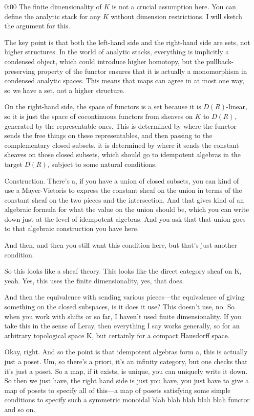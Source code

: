 \begin{unfinished}{0:00}
The finite dimensionality of $K$ is not a crucial assumption here. You can define the analytic stack for any $K$ without dimension restrictions. I will sketch the argument for this.

The key point is that both the left-hand side and the right-hand side are sets, not higher structures. In the world of analytic stacks, everything is implicitly a condensed object, which could introduce higher homotopy, but the pullback-preserving property of the functor ensures that it is actually a monomorphism in condensed analytic spaces. This means that maps can agree in at most one way, so we have a set, not a higher structure.

On the right-hand side, the space of functors is a set because it is $D(R)$-linear, so it is just the space of cocontinuous functors from sheaves on $K$ to $D(R)$, generated by the representable ones. This is determined by where the functor sends the free things on these representables, and then passing to the complementary closed subsets, it is determined by where it sends the constant sheaves on those closed subsets, which should go to idempotent algebras in the target $D(R)$, subject to some natural conditions.


Construction. There's a, if you have a union of closed subsets, you can kind of use a Mayer-Vietoris to express the constant sheaf on the union in terms of the constant sheaf on the two pieces and the intersection. And that gives kind of an algebraic formula for what the value on the union should be, which you can write down just at the level of idempotent algebras. And you ask that that union goes to that algebraic construction you have here.

And then, and then you still want this condition here, but that's just another condition.

So this looks like a sheaf theory. This looks like the direct category sheaf on K, yeah. Yes, this uses the finite dimensionality, yes, that does. 

And then the equivalence with sending various pieces---the equivalence of giving something on the closed subspaces, is it does it use? This doesn't use, no. So when you work with shifts or so far, I haven't used finite dimensionality. If you take this in the sense of Leray, then everything I say works generally, so for an arbitrary topological space K, but certainly for a compact Hausdorff space.

Okay, right. And so the point is that idempotent algebras form a, this is actually just a poset. Um, so there's a priori, it's an infinity category, but one checks that it's just a poset. So a map, if it exists, is unique, you can uniquely write it down. So then we just have, the right hand side is just you have, you just have to give a map of posets to specify all of this---a map of posets satisfying some simple conditions to specify such a symmetric monoidal blah blah blah blah blah functor and so on.


\end{unfinished}
